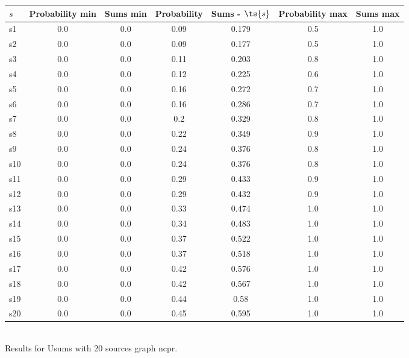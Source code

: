 \documentclass{article}
\begin{document}
\noindent\begin{tabular}{|l|c|c|c|c|c|c|}
\hline
$s$& Probability min & Sums min & Probability & Sums - $\ts{s}$ & Probability max & Sums max\\
\hline
s1 &0.0 & 0.0 & 0.09 & 0.179 & 0.5 & 1.0\\
\hline
s2 &0.0 & 0.0 & 0.09 & 0.177 & 0.5 & 1.0\\
\hline
s3 &0.0 & 0.0 & 0.11 & 0.203 & 0.8 & 1.0\\
\hline
s4 &0.0 & 0.0 & 0.12 & 0.225 & 0.6 & 1.0\\
\hline
s5 &0.0 & 0.0 & 0.16 & 0.272 & 0.7 & 1.0\\
\hline
s6 &0.0 & 0.0 & 0.16 & 0.286 & 0.7 & 1.0\\
\hline
s7 &0.0 & 0.0 & 0.2 & 0.329 & 0.8 & 1.0\\
\hline
s8 &0.0 & 0.0 & 0.22 & 0.349 & 0.9 & 1.0\\
\hline
s9 &0.0 & 0.0 & 0.24 & 0.376 & 0.8 & 1.0\\
\hline
s10 &0.0 & 0.0 & 0.24 & 0.376 & 0.8 & 1.0\\
\hline
s11 &0.0 & 0.0 & 0.29 & 0.433 & 0.9 & 1.0\\
\hline
s12 &0.0 & 0.0 & 0.29 & 0.432 & 0.9 & 1.0\\
\hline
s13 &0.0 & 0.0 & 0.33 & 0.474 & 1.0 & 1.0\\
\hline
s14 &0.0 & 0.0 & 0.34 & 0.483 & 1.0 & 1.0\\
\hline
s15 &0.0 & 0.0 & 0.37 & 0.522 & 1.0 & 1.0\\
\hline
s16 &0.0 & 0.0 & 0.37 & 0.518 & 1.0 & 1.0\\
\hline
s17 &0.0 & 0.0 & 0.42 & 0.576 & 1.0 & 1.0\\
\hline
s18 &0.0 & 0.0 & 0.42 & 0.567 & 1.0 & 1.0\\
\hline
s19 &0.0 & 0.0 & 0.44 & 0.58 & 1.0 & 1.0\\
\hline
s20 &0.0 & 0.0 & 0.45 & 0.595 & 1.0 & 1.0\\
\hline
\end{tabular}\\

\noindent Results for Usums with 20 sources graph ncpr.
\end{document}
